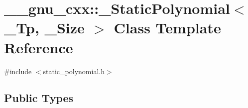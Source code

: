 \hypertarget{class____gnu__cxx_1_1__StaticPolynomial}{}\section{\+\_\+\+\_\+gnu\+\_\+cxx\+:\+:\+\_\+\+Static\+Polynomial$<$ \+\_\+\+Tp, \+\_\+\+Size $>$ Class Template Reference}
\label{class____gnu__cxx_1_1__StaticPolynomial}


{\ttfamily \#include $<$static\+\_\+polynomial.\+h$>$}

\subsection*{Public Types}
